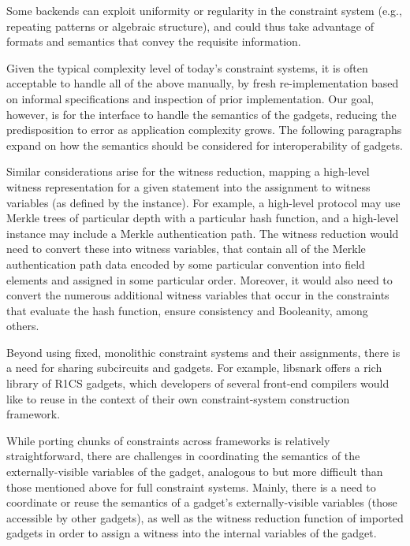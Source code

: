 \documentclass[a4paper,12pt]{article}
\begin{document}
Some backends can exploit uniformity or regularity in the constraint system (e.g., repeating patterns or algebraic structure), and could thus take advantage of formats and semantics that convey the requisite information.

Given the typical complexity level of today’s constraint systems, it is often acceptable to handle all of the above manually, by fresh re-implementation based on informal specifications and inspection of prior implementation. Our goal, however, is for the interface to handle the semantics of the gadgets, reducing the predisposition to error as application complexity grows. The following paragraphs expand on how the semantics should be considered for interoperability of gadgets.

Similar considerations arise for the witness reduction, mapping a high-level witness representation for a given statement into the assignment to witness variables (as defined by the instance). For example, a high-level protocol may use Merkle trees of particular depth with a particular hash function, and a high-level instance may include a Merkle authentication path. The witness reduction would need to convert these into witness variables, that contain all of the Merkle authentication path data encoded by some particular convention into field elements and assigned in some particular order. Moreover, it would also need to convert the numerous additional witness variables that occur in the constraints that evaluate the hash function, ensure consistency and Booleanity, among others.

Beyond using fixed, monolithic constraint systems and their assignments, there is a need for sharing subcircuits and gadgets. For example, libsnark offers a rich library of R1CS gadgets, which developers of several front-end compilers would like to reuse in the context of their own constraint-system construction framework. 

While porting chunks of constraints across frameworks is relatively straightforward, there are challenges in coordinating the semantics of the externally-visible variables of the gadget, analogous to but more difficult than those mentioned above for full constraint systems. Mainly, there is a need to coordinate or reuse the semantics of a gadget’s externally-visible variables (those accessible by other gadgets), as well as the witness reduction function of imported gadgets in order to assign a witness into the internal variables of the gadget.
\end{document}
